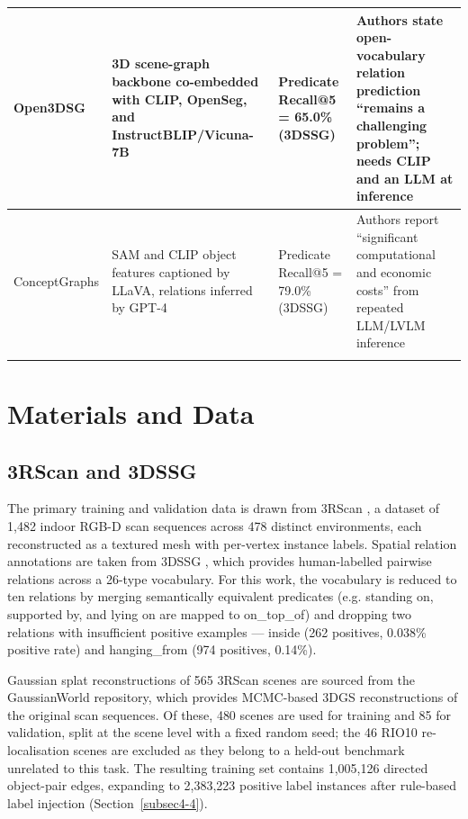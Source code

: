 \documentclass[sn-mathphys,Numbered]{sn-jnl}
\begin{document}
\begin{table}[htbp]
\begin{tabular}{@{}p{2.1cm}p{3.8cm}p{1.9cm}p{3.5cm}@{}}
\midrule
Open3DSG \cite{koch2024open3dsg} & 3D scene-graph backbone co-embedded with CLIP, OpenSeg, and InstructBLIP/Vicuna-7B & Predicate Recall@5 = 65.0\% (3DSSG) & Authors state open-vocabulary relation prediction ``remains a challenging problem''; needs CLIP and an LLM at inference \\
\midrule
ConceptGraphs \cite{gu2023conceptgraphs} & SAM and CLIP object features captioned by LLaVA, relations inferred by GPT-4 & Predicate Recall@5 = 79.0\% (3DSSG) & Authors report ``significant computational and economic costs'' from repeated LLM/LVLM inference \\
\botrule
\end{tabular}
\end{table}

\FloatBarrier
\section{Materials and Data}\label{sec3}

\FloatBarrier
\subsection{3RScan and 3DSSG}\label{subsec3-1}

The primary training and validation data is drawn from 3RScan \cite{wald2019rio}, a dataset of 1,482 indoor RGB-D scan sequences across 478 distinct environments, each reconstructed as a textured mesh with per-vertex instance labels. Spatial relation annotations are taken from 3DSSG \cite{wald2020dsssg}, which provides human-labelled pairwise relations across a 26-type vocabulary. For this work, the vocabulary is reduced to ten relations by merging semantically equivalent predicates (e.g. standing on, supported by, and lying on are mapped to on\_top\_of) and dropping two relations with insufficient positive examples --- inside (262 positives, 0.038\% positive rate) and hanging\_from (974 positives, 0.14\%).

Gaussian splat reconstructions of 565 3RScan scenes are sourced from the GaussianWorld repository, which provides MCMC-based 3DGS reconstructions of the original scan sequences. Of these, 480 scenes are used for training and 85 for validation, split at the scene level with a fixed random seed; the 46 RIO10 re-localisation scenes are excluded as they belong to a held-out benchmark unrelated to this task. The resulting training set contains 1,005,126 directed object-pair edges, expanding to 2,383,223 positive label instances after rule-based label injection (Section~\ref{subsec4-4}).
\end{document}
